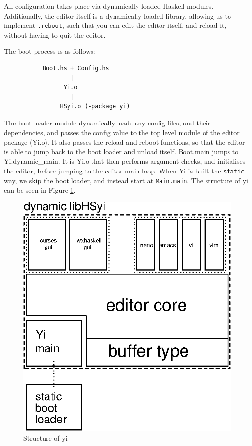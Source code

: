 \documentclass[]{article}
\newcommand{\code}[1]{\texttt{#1}}
\begin{document}
All configuration takes place via dynamically loaded Haskell modules.
Additionally, the editor itself is a dynamically loaded library,
allowing us to implement \code{:reboot}, such that you can edit the
editor itself, and reload it, without having to quit the editor.

The boot process is as follows:

\begin{verbatim}
           Boot.hs + Config.hs
                   |
                 Yi.o
                   |
                HSyi.o (-package yi)
\end{verbatim}

The boot loader module dynamically loads any config files, and their
dependencies, and passes the config value to the top level module of the
editor package (Yi.o). It also passes the reload and reboot functions,
so that the editor is able to jump back to the boot loader and unload
itself. Boot.main jumps to Yi.dynamic\_main. It is Yi.o that then
performs argument checks, and initialises the editor, before jumping to
the editor main loop. When Yi is built the \code{static} way, we skip
the boot loader, and instead start at \code{Main.main}. The structure of
yi can be seen in Figure \ref{overview}.

\begin{figure}
  \begin{center}
    \includegraphics[scale=0.7]{yi_overview.eps}
    \caption{Structure of yi}
    \label{overview}
  \end{center}
\end{figure}
%
\end{document}
